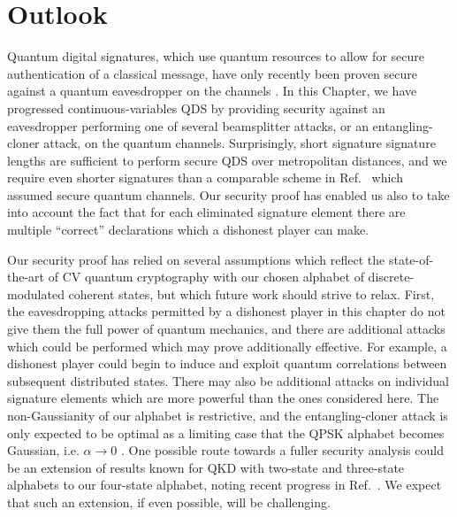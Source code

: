 \clearpage
\section{Outlook}
Quantum digital signatures, which use quantum resources to allow for secure authentication of a classical message, have only recently been proven secure against a quantum eavesdropper on the channels \cite{Amiri2016, Puthoor2016, Yin2016}. In this Chapter, we have progressed continuous-variables QDS by providing security against an eavesdropper performing one of several beamsplitter attacks, or an entangling-cloner attack, on the quantum channels. Surprisingly, short signature signature lengths are sufficient to perform secure QDS over metropolitan distances, and we require even shorter signatures than a comparable scheme in Ref.~\cite{Croal2016} which assumed secure quantum channels. Our security proof has enabled us also to take into account the fact that for each eliminated signature element there are multiple ``correct'' declarations which a dishonest player can make.

Our security proof has relied on several assumptions which reflect the state-of-the-art of CV quantum cryptography with our chosen alphabet of discrete-modulated coherent states, but which future work should strive to relax. First, the eavesdropping attacks permitted by a dishonest player in this chapter do not give them the full power of quantum mechanics, and there are additional attacks which could be performed which may prove additionally effective. For example, a dishonest player could begin to induce and exploit quantum correlations between subsequent distributed states. There may also be additional attacks on individual signature elements which are more powerful than the ones considered here. The non-Gaussianity of our alphabet is restrictive, and the entangling-cloner attack is only expected to be optimal as a limiting case that the QPSK alphabet becomes Gaussian, i.e. $\alpha \rightarrow 0$ \cite{Navascues2006, Garcia-Patron2006}. One possible route towards a fuller security analysis could be an extension of results known for QKD with two-state \cite{Zhao2009} and three-state \cite{Bradler2018} alphabets to our four-state alphabet, noting recent progress in Ref.~\cite{Papanastasiou2018}. We expect that such an extension, if even possible, will be challenging.


